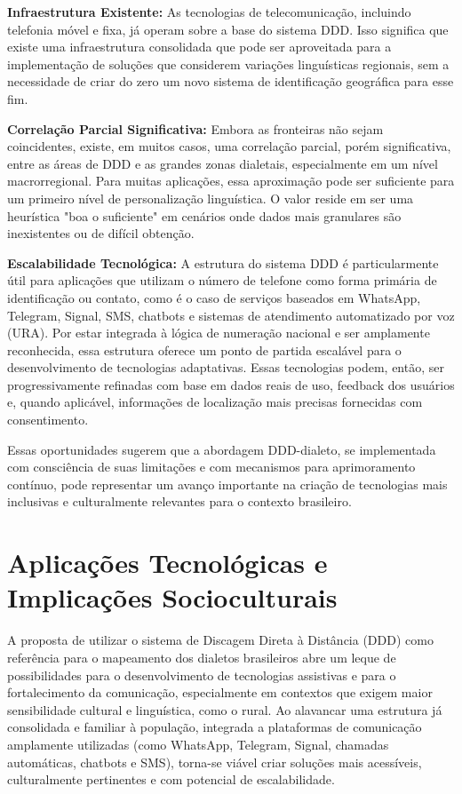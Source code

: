 \textbf{Infraestrutura Existente:} As tecnologias de telecomunicação, incluindo telefonia móvel e fixa, já operam sobre a base do sistema DDD. Isso significa que existe uma infraestrutura consolidada que pode ser aproveitada para a implementação de soluções que considerem variações linguísticas regionais, sem a necessidade de criar do zero um novo sistema de identificação geográfica para esse fim.

\textbf{Correlação Parcial Significativa:} Embora as fronteiras não sejam coincidentes, existe, em muitos casos, uma correlação parcial, porém significativa, entre as áreas de DDD e as grandes zonas dialetais, especialmente em um nível macrorregional. Para muitas aplicações, essa aproximação pode ser suficiente para um primeiro nível de personalização linguística. O valor reside em ser uma heurística "boa o suficiente" em cenários onde dados mais granulares são inexistentes ou de difícil obtenção.

\textbf{Escalabilidade Tecnológica:} A estrutura do sistema DDD é particularmente útil para aplicações que utilizam o número de telefone como forma primária de identificação ou contato, como é o caso de serviços baseados em WhatsApp, Telegram, Signal, SMS, chatbots e sistemas de atendimento automatizado por voz (URA). Por estar integrada à lógica de numeração nacional e ser amplamente reconhecida, essa estrutura oferece um ponto de partida escalável para o desenvolvimento de tecnologias adaptativas. Essas tecnologias podem, então, ser progressivamente refinadas com base em dados reais de uso, feedback dos usuários e, quando aplicável, informações de localização mais precisas fornecidas com consentimento.

Essas oportunidades sugerem que a abordagem DDD-dialeto, se implementada com consciência de suas limitações e com mecanismos para aprimoramento contínuo, pode representar um avanço importante na criação de tecnologias mais inclusivas e culturalmente relevantes para o contexto brasileiro.

\section{Aplicações Tecnológicas e Implicações Socioculturais}


A proposta de utilizar o sistema de Discagem Direta à Distância (DDD) como referência para o mapeamento dos dialetos brasileiros abre um leque de possibilidades para o desenvolvimento de tecnologias assistivas e para o fortalecimento da comunicação, especialmente em contextos que exigem maior sensibilidade cultural e linguística, como o rural. Ao alavancar uma estrutura já consolidada e familiar à população, integrada a plataformas de comunicação amplamente utilizadas (como WhatsApp, Telegram, Signal, chamadas automáticas, chatbots e SMS), torna-se viável criar soluções mais acessíveis, culturalmente pertinentes e com potencial de escalabilidade.

